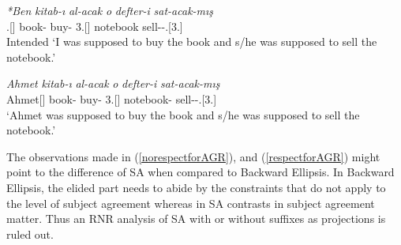 \begin{exe}
    \ex \label{respectforAGR}
    \begin{xlist}
        \ex 
        \gll
        \textit{*Ben} \textit{kitab-ı} \textit{al-acak} \textit{o} \textit{defter-i} \textit{sat-acak-mış} \\ {\First}.{\Sg}[{\Nom}] book-{\Acc} buy-{\Fut} 3.{\Sg}[{\Nom}] notebook sell-{\Fut}-{\Cop}.{\Prf}[3.{\Sg}] \\
        \glt Intended `I was supposed to buy the book and s/he was supposed to sell the notebook.'
        
        \ex 
        \gll 
        \textit{Ahmet} \textit{kitab-ı} \textit{al-acak} \textit{o} \textit{defter-i} \textit{sat-acak-mış} \\ Ahmet[{\Nom}] book-{\Acc} buy-{\Fut} 3.{\Sg}[{\Nom}] notebook-{\Acc} sell-{\Fut}-{\Cop}.{\Prf}[3.{\Sg}] \\
        \glt `Ahmet was supposed to buy the book and s/he was supposed to sell the notebook.'
    \end{xlist}
\end{exe}

The observations made in (\ref{norespectforAGR}), and (\ref{respectforAGR}) might point to the difference of SA when compared to Backward Ellipsis. In Backward Ellipsis, the elided part needs to abide by the constraints that do not apply to the level of subject agreement whereas in SA contrasts in subject agreement matter. Thus an RNR analysis of SA with or without suffixes as projections is ruled out. 